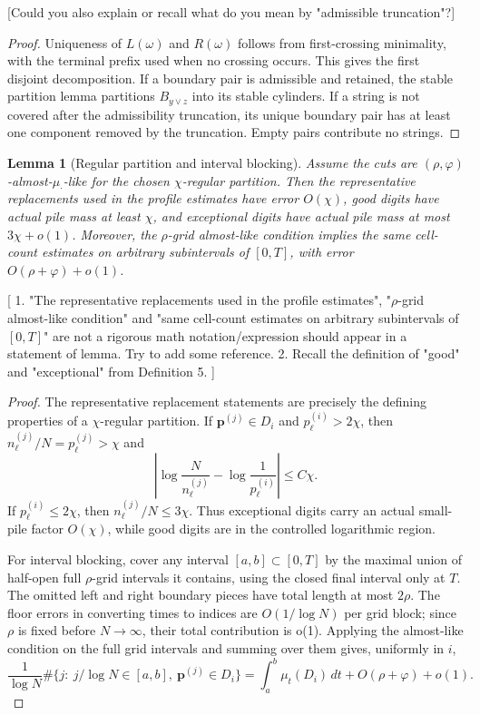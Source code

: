 \documentclass[11pt]{article}
\newtheorem{lem}{Lemma}
\newcommand{\bp}{\mathbf p}
\newcommand{\jscomment}[1]{\textup{\textsf{\color{blue}[#1]}}}
\begin{document}
\jscomment{Could you also explain or recall what do you mean by "admissible truncation"?}

\begin{proof}
Uniqueness of \(L(\omega)\) and \(R(\omega)\) follows from first-crossing
minimality, with the terminal prefix used when no crossing occurs. This
gives the first disjoint decomposition. If a boundary pair is admissible
and retained, the stable partition lemma partitions \(B_{y\vee z}\) into its stable
cylinders. If a string is not covered after the admissibility truncation,
its unique boundary pair has at least one component removed by the
truncation. Empty pairs contribute no strings.
\end{proof}

\begin{lem}[Regular partition and interval blocking]
Assume the cuts are \((\rho,\varphi)\)-almost-\(\mu_\cdot\)-like for the
chosen \(\chi\)-regular partition. Then the representative replacements
used in the profile estimates have error \(O(\chi)\), good digits have
actual pile mass at least \(\chi\), and exceptional digits have actual
pile mass at most \(3\chi+o(1)\). Moreover, the \(\rho\)-grid
almost-like condition implies the same cell-count estimates on arbitrary
subintervals of \([0,T]\), with error \(O(\rho+\varphi)+o(1)\).
\end{lem}

\jscomment{
1. "The representative replacements used in the profile estimates", "\(\rho\)-grid
almost-like condition" and "same cell-count estimates on arbitrary
subintervals of \([0,T]\)" are not a rigorous math notation/expression should appear in a statement of lemma.
Try to add some reference.
2. Recall the definition of "good" and "exceptional" from Definition 5.
}

\begin{proof}
The representative replacement statements are precisely the defining
properties of a \(\chi\)-regular partition. If
\(\bp^{(j)}\in D_i\) and \(p_\ell^{(i)}>2\chi\), then
\(n_\ell^{(j)}/N=p_\ell^{(j)}>\chi\) and
\[
    \left|
    \log\frac{N}{n_\ell^{(j)}}-\log\frac1{p_\ell^{(i)}}
    \right|\le C\chi .
\]
If \(p_\ell^{(i)}\le2\chi\), then
\(n_\ell^{(j)}/N\le3\chi\). Thus exceptional digits carry an actual
small-pile factor \(O(\chi)\), while good digits are in the controlled
logarithmic region.

For interval blocking, cover any interval \([a,b]\subset[0,T]\) by the
maximal union of half-open full \(\rho\)-grid intervals it contains,
using the closed final interval only at \(T\). The omitted left and right
boundary pieces have total length at most \(2\rho\). The floor errors in
converting times to indices are \(O(1/\log N)\) per grid block; since
\(\rho\) is fixed before \(N\to\infty\), their total contribution is
o(1). Applying the almost-like condition on the full grid intervals and
summing over them gives, uniformly in \(i\),
\[
    \frac1{\log N}\#\{j:\ j/\log N\in[a,b],\ \bp^{(j)}\in D_i\}
    =
    \int_a^b\mu_t(D_i)\,dt+O(\rho+\varphi)+o(1).
\]
\end{proof}
\end{document}
